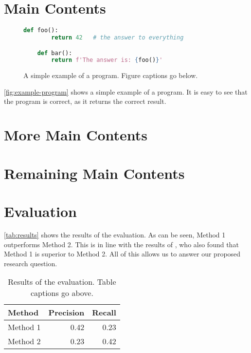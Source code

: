 \documentclass[thesis]{plai}
\begin{document}
\chapter{Main Contents}
\label{chapter:content1}

\lipsum[2-8]

\begin{figure}[t]
    \begin{lstlisting}[language=Python, gobble=4]
    def foo():
        return 42   # the answer to everything

    def bar():
        return f'The answer is: {foo()}'
    \end{lstlisting}
    \caption{A simple example of a program. Figure captions go below.}
    \label{fig:example-program}
\end{figure}

\autoref{fig:example-program} shows a simple example of a program.
It is easy to see that the program is correct, as it returns the correct result.

\chapter{More Main Contents}
\label{chapter:content2}

\lipsum[2-3]


\chapter{Remaining Main Contents}
\label{chapter:content3}

\lipsum[2-3]

\chapter{Evaluation}
\label{chapter:evaluation}

\lipsum[2-4]

\autoref{tab:results} shows the results of the evaluation.
As can be seen, Method 1 outperforms Method 2.
This is in line with the results of \citet{phdthesis-kinder}, who also found that Method 1 is superior to Method 2.
All of this allows us to answer our proposed research question.

\begin{table}[t]
    \centering
    \caption{Results of the evaluation. Table captions go above.}
    \label{tab:results}
    \begin{tabularx}{.7\linewidth}{Xrr}
        \toprule
        \textbf{Method} & \textbf{Precision} & \textbf{Recall} \\
        \midrule
        Method 1 & 0.42 & 0.23 \\
        Method 2 & 0.23 & 0.42 \\
        \bottomrule
    \end{tabularx}
\end{table}
\end{document}
